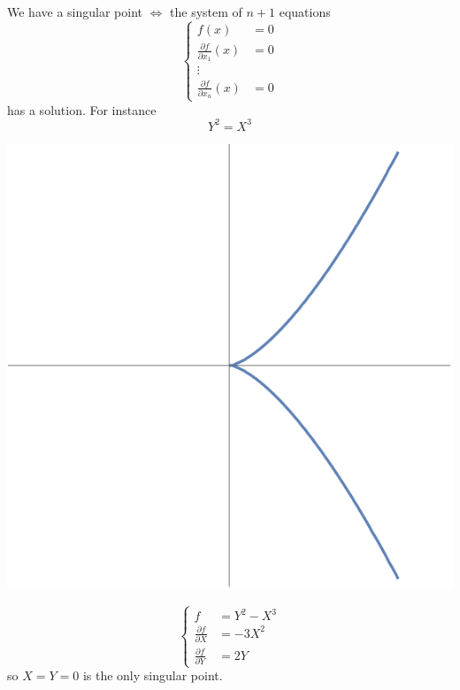 \documentclass[11pt]{article}
\theoremstyle{definition}
\newcommand{\pd}{\partial}
\newcommand{\Llrta}{\Longleftrightarrow}
\begin{document}
We have a singular point $\Llrta$ the system of $n+1$ equations 
$$
\left\{ \begin{aligned}
f(x)&=0\\
\frac{\pd f}{\pd x_1}(x)&=0\\
\vdots &\\
\frac{\pd f}{\pd x_n}(x)&=0
\end{aligned}\right.
$$
has a solution. 
For instance 
$$
Y^2=X^3
$$
\begin{center}
\includegraphics[scale=0.5]{Y^2-X^3}
\end{center}

$$
\left\{ \begin{aligned}
f&=Y^2-X^3\\
\frac{\pd f}{\pd X}&=-3X^2\\
\frac{\pd f}{\pd Y}&=2Y
\end{aligned}\right.
$$
so $X=Y=0$ is the only singular point.
\end{document}
